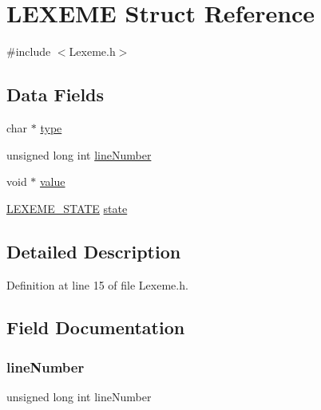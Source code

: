 \hypertarget{struct_l_e_x_e_m_e}{}\section{L\+E\+X\+E\+ME Struct Reference}
\label{struct_l_e_x_e_m_e}


{\ttfamily \#include $<$Lexeme.\+h$>$}

\subsection*{Data Fields}
\begin{DoxyCompactItemize}
\item 
char $\ast$ \mbox{\hyperlink{struct_l_e_x_e_m_e_a23506fc4821ab6d9671f3e6222591a96}{type}}
\item 
unsigned long int \mbox{\hyperlink{struct_l_e_x_e_m_e_a3f19ebeaa8c130292bd9ce502be1d1a3}{line\+Number}}
\item 
void $\ast$ \mbox{\hyperlink{struct_l_e_x_e_m_e_a0f61d63b009d0880a89c843bd50d8d76}{value}}
\item 
\mbox{\hyperlink{_f_s_m_lexeme_8h_a5d966dc44e04ff2eef3b33046a1e67ad}{L\+E\+X\+E\+M\+E\+\_\+\+S\+T\+A\+TE}} \mbox{\hyperlink{struct_l_e_x_e_m_e_af2253914b7dd2807b30fff801d67a7b2}{state}}
\end{DoxyCompactItemize}


\subsection{Detailed Description}


Definition at line 15 of file Lexeme.\+h.



\subsection{Field Documentation}
\mbox{\label{struct_l_e_x_e_m_e_a3f19ebeaa8c130292bd9ce502be1d1a3}} 
\subsubsection{\texorpdfstring{line\+Number}{lineNumber}}
{\footnotesize\ttfamily unsigned long int line\+Number}



